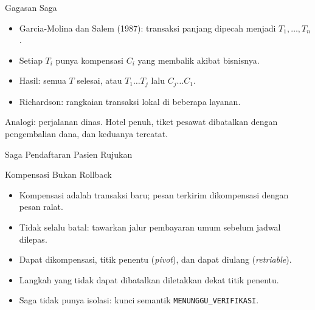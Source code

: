 \documentclass[aspectratio=169, table, 12pt]{beamer}
\begin{document}
\begin{frame}{{\Large Gagasan Saga}}
  \vspace{6pt}
  \small
  \begin{itemize}
    \item Garcia-Molina dan Salem (1987): transaksi panjang dipecah menjadi
          $T_1, \ldots, T_n$.
    \item Setiap $T_i$ punya kompensasi $C_i$ yang membalik akibat bisnisnya.
    \item Hasil: semua $T$ selesai, atau $T_1 \ldots T_j$ lalu $C_j \ldots C_1$.
    \item Richardson: rangkaian transaksi lokal di beberapa layanan.
  \end{itemize}
  \vspace{6pt}
  {\small Analogi: perjalanan dinas. Hotel penuh, tiket pesawat dibatalkan
  dengan pengembalian dana, dan keduanya tercatat.}
\end{frame}

\begin{frame}{{\Large Saga Pendaftaran Pasien Rujukan}}
  \centering
\end{frame}

\begin{frame}{{\Large Kompensasi Bukan Rollback}}
  \vspace{6pt}
  \small
  \begin{itemize}
    \item Kompensasi adalah transaksi baru; pesan terkirim dikompensasi dengan
          pesan ralat.
    \item Tidak selalu batal: tawarkan jalur pembayaran umum sebelum jadwal
          dilepas.
    \item Dapat dikompensasi, titik penentu (\textit{pivot}), dan dapat diulang
          (\textit{retriable}).
    \item Langkah yang tidak dapat dibatalkan diletakkan dekat titik penentu.
    \item Saga tidak punya isolasi: kunci semantik
          \texttt{MENUNGGU\_VERIFIKASI}.
  \end{itemize}
\end{frame}
\end{document}
